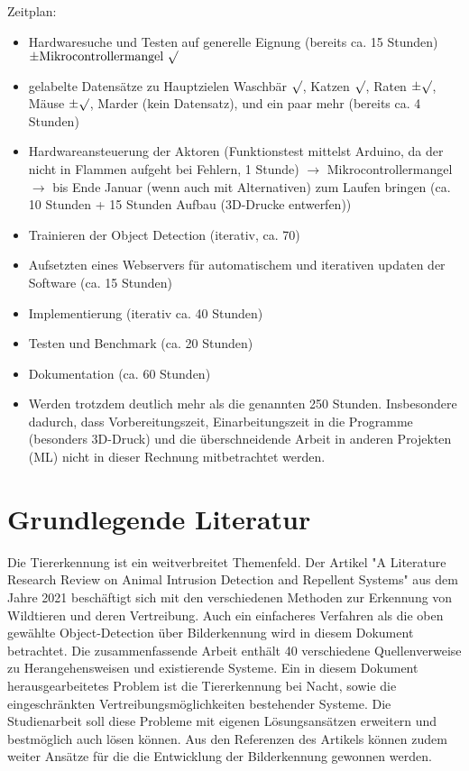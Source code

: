 \documentclass{scrartcl}
\begin{document}
Zeitplan:
\begin{itemize}
    \item Hardwaresuche und Testen auf generelle Eignung (bereits ca. 15 Stunden) $\pm\textrm{Mikrocontrollermangel } \surd$
    \item gelabelte Datensätze zu Hauptzielen Waschbär $\surd$, Katzen $\surd$, Raten $\pm \surd$, Mäuse $\pm \surd$, Marder (kein Datensatz), und ein paar mehr (bereits ca. 4 Stunden)
    \item Hardwareansteuerung der Aktoren (Funktionstest mittelst Arduino, da der nicht in Flammen aufgeht bei Fehlern, 1 Stunde) $\rightarrow$ Mikrocontrollermangel\\
    $\rightarrow$ bis Ende Januar (wenn auch mit Alternativen) zum Laufen bringen (ca. 10 Stunden + 15 Stunden Aufbau (3D-Drucke entwerfen))
    \item Trainieren der Object Detection (iterativ, ca. 70)
    \item Aufsetzten eines Webservers für automatischem und iterativen updaten der Software (ca. 15 Stunden)
    \item Implementierung (iterativ ca. 40 Stunden)
    \item Testen und Benchmark (ca. 20 Stunden)
    \item Dokumentation (ca. 60 Stunden)
    \item Werden trotzdem deutlich mehr als die genannten 250 Stunden. Insbesondere dadurch, dass Vorbereitungszeit, Einarbeitungszeit in die Programme (besonders 3D-Druck) und die überschneidende Arbeit in anderen Projekten (ML) nicht in dieser Rechnung mitbetrachtet werden.
\end{itemize}


\section{Grundlegende Literatur}

Die Tiererkennung ist ein weitverbreitet Themenfeld. Der Artikel "A Literature Research Review on Animal Intrusion Detection and Repellent Systems" aus dem Jahre 2021 beschäftigt sich mit den verschiedenen Methoden zur Erkennung von Wildtieren und deren Vertreibung. Auch ein einfacheres Verfahren als die oben gewählte Object-Detection über Bilderkennung wird in diesem Dokument betrachtet. Die zusammenfassende Arbeit enthält 40 verschiedene Quellenverweise zu Herangehensweisen und existierende Systeme. Ein in diesem Dokument herausgearbeitetes Problem ist die Tiererkennung bei Nacht, sowie die eingeschränkten Vertreibungsmöglichkeiten bestehender Systeme. Die Studienarbeit soll diese Probleme mit eigenen Lösungsansätzen erweitern und bestmöglich auch lösen können. Aus den Referenzen des Artikels können zudem weiter Ansätze für die die Entwicklung der Bilderkennung gewonnen werden.\cite{L2021ALR}


\printbibliography
\end{document}
